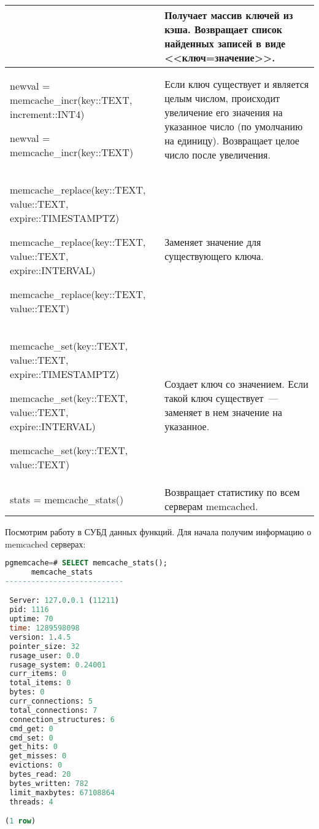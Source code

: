 \begin{table}[h]
\begin{tabular}{| >{\raggedright\scriptsize}p{7cm}| >{\scriptsize}p{7cm} |}
&
Получает массив ключей из кэша.
Возвращает список найденных записей в виде <<ключ=значение>>.\\

\hline

newval = memcache\_incr(key::TEXT, increment::INT4)

newval = memcache\_incr(key::TEXT)

&
Если ключ существует и является целым числом, происходит увеличение
его значения на указанное число (по умолчанию на единицу).
Возвращает целое число после увеличения.\\

\hline

memcache\_replace(key::TEXT, value::TEXT, expire::TIMESTAMPTZ)

memcache\_replace(key::TEXT, value::TEXT, expire::INTERVAL)

memcache\_replace(key::TEXT, value::TEXT)

&
Заменяет значение для существующего ключа.\\

\hline

memcache\_set(key::TEXT, value::TEXT, expire::TIMESTAMPTZ)

memcache\_set(key::TEXT, value::TEXT, expire::INTERVAL)

memcache\_set(key::TEXT, value::TEXT)

&
Создает ключ со значением. Если такой ключ существует~--- заменяет в нем значение на указанное.\\

\hline

stats = memcache\_stats()

&
Возвращает статистику по всем серверам memcached.\\

\hline
\end{tabular}
\end{table}

Посмотрим работу в СУБД данных функций. Для начала получим информацию о memcached серверах:

\begin{lstlisting}[language=SQL,label=lst:pgcache8,caption=Проверка memcache\_stats]
pgmemcache=# SELECT memcache_stats();
      memcache_stats
---------------------------

 Server: 127.0.0.1 (11211)
 pid: 1116
 uptime: 70
 time: 1289598098
 version: 1.4.5
 pointer_size: 32
 rusage_user: 0.0
 rusage_system: 0.24001
 curr_items: 0
 total_items: 0
 bytes: 0
 curr_connections: 5
 total_connections: 7
 connection_structures: 6
 cmd_get: 0
 cmd_set: 0
 get_hits: 0
 get_misses: 0
 evictions: 0
 bytes_read: 20
 bytes_written: 782
 limit_maxbytes: 67108864
 threads: 4

(1 row)
\end{lstlisting}


